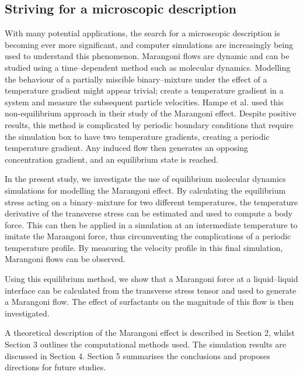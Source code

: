 \subsection{Striving for a microscopic description}
With many potential applications, the search for a microscopic description is becoming ever more significant, and computer simulations are increasingly being used to understand this phenomenon.
Marangoni flows are dynamic and can be studied using a time--dependent method such as molecular dynamics.
Modelling the behaviour of a partially miscible binary--mixture under the effect of a temperature gradient might appear trivial; create a temperature gradient in a system and measure the subsequent particle velocities.
Hampe et al. used this non-equilibrium approach in their study of the Marangoni effect.\cite{HolgerBoppHampe}
Despite positive results, this method is complicated by periodic boundary conditions that require the simulation box to have two temperature gradients, creating a periodic temperature gradient.
Any induced flow then generates an opposing concentration gradient, and an equilibrium state is reached.

In the present study, we investigate the use of equilibrium molecular dynamics simulations for modelling the Marangoni effect.
By calculating the equilibrium stress acting on a binary--mixture for two different temperatures, the temperature derivative of the transverse stress can be estimated and used to compute a body force.
This can then be applied in a simulation at an intermediate temperature to imitate the Marangoni force, thus circumventing the complications of a periodic temperature profile.
By measuring the velocity profile in this final simulation, Marangoni flows can be observed.

Using this equilibrium method, we show that a Marangoni force at a liquid--liquid interface can be calculated from the transverse stress tensor and used to generate a Marangoni flow.
The effect of surfactants on the magnitude of this flow is then investigated.

A theoretical description of the Marangoni effect is described in Section 2, whilst Section 3 outlines the computational methods used.
The simulation results are discussed in Section 4.
Section 5 summarises the conclusions and proposes directions for future studies.
